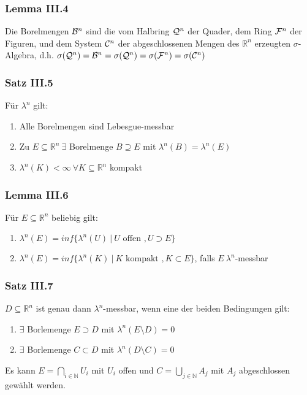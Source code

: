 
\begin{frame}
\frametitle{Lemma III.4}
Die Borelmengen $\mathcal{B}^n$ sind die vom Halbring $\mathcal{Q}^n$ der Quader, dem Ring $\mathcal{F}^n$ der Figuren, und dem System $\mathcal{C}^n$ der abgeschlossenen Mengen des $\mathbb{R}^n$ erzeugten $\sigma$-Algebra, d.h. $\sigma(\mathcal{Q}^n) = \mathcal{B}^n = \sigma(\mathcal{Q}^n) = \sigma(\mathcal{F}^n) = \sigma(\mathcal{C}^n)$
\end{frame}


\begin{frame}
\frametitle{Satz III.5}
Für $\lambda^n$ gilt:
    \begin{enumerate}[label=\roman*)]
      \item Alle Borelmengen sind Lebesgue-messbar 
      \item Zu $E \subseteq \mathbb{R}^n \ \exists$ Borelmenge $B \supseteq E$ mit $\lambda^n(B) = \lambda^n(E)$
      \item $\lambda^n(K) < \infty \ \forall K \subseteq \mathbb{R}^n$ kompakt
    \end{enumerate}
\end{frame}


\begin{frame}
\frametitle{Lemma III.6}
Für $E \subseteq \mathbb{R}^n$ beliebig gilt:
    \begin{enumerate}[label=\roman*)]
      \item $\lambda^n(E) = inf\{\lambda^n(U) \ | \ U \text{ offen }, U \supset E\}$
      \item $\lambda^n(E) = inf\{\lambda^n(K) \ | \ K \text{ kompakt }, K \subset E\}$, falls $E \ \lambda^n$-messbar
    \end{enumerate}
\end{frame}


\begin{frame}
\frametitle{Satz III.7}
$D \subseteq \mathbb{R}^n$ ist genau dann $\lambda^n$-messbar, wenn eine der beiden Bedingungen gilt:
    \begin{enumerate}[label=\roman*)]
      \item $\exists$ Borlemenge $E \supset D$ mit $\lambda^n(E \setminus D) = 0$
      \item $\exists$ Borlemenge $C \subset D$ mit $\lambda^n(D \setminus C) = 0$
    \end{enumerate}
    Es kann $E = \bigcap\limits_{i \in \mathbb{N}} U_i$ mit $U_i$ offen und $C = \bigcup\limits_{j \in \mathbb{N}} A_j$ mit $A_j$ abgeschlossen gewählt werden.
\end{frame}


